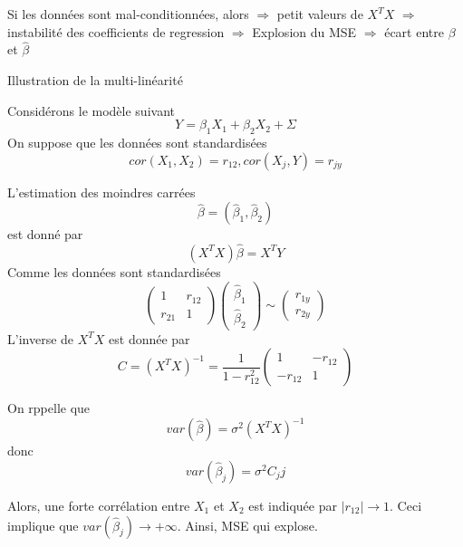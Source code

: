 \documentclass{article}
\begin{document}
Si les donn\'ees sont mal-conditionn\'ees, alors
$\Rightarrow$ petit valeurs de $X^TX$
$\Rightarrow$ instabilit\'e des coefficients de regression
$\Rightarrow$ Explosion du MSE
$\Rightarrow$ \'ecart entre $\beta$ et $\hat{\beta}$


Illustration de la multi-lin\'earit\'e

Consid\'erons le mod\`ele suivant
\begin{equation}
Y=\beta_1X_1+\beta_2X_2+\Sigma
\end{equation}
On suppose que les donn\'ees sont standardis\'ees
\begin{equation}
cor(X_1,X_2)=r_{12}, cor(X_j,Y)=r_{jy}
\end{equation}

L'estimation des moindres carr\'ees 
\begin{equation}
\hat{\beta}=(\hat{\beta}_1,\hat{\beta}_2)
\end{equation}
est donn\'e par
\begin{equation}
(X^TX)\hat{\beta}=X^TY
\end{equation}
Comme les donn\'ees sont standardis\'ees
\begin{equation}
\left(\begin{array}{cc}
1 & r_{12} \\
r_{21} & 1
\end{array}\right)
\left(\begin{array}{cc}
\hat{\beta}_1\\
\hat{\beta}_2
\end{array}\right)\sim
\left(\begin{array}{c}
r_{1y}\\
r_{2y}
\end{array}\right)
\end{equation}
L'inverse de $X^TX$ est donn\'ee par 
\begin{equation}
C=(X^TX)^{-1}=\frac{1}{1-r_{12}^2}\left(\begin{array}{cc}
1 & -r_{12}\\
-r_{12} & 1
\end{array}\right)
\end{equation}

On rppelle que
\begin{equation}
var(\hat{\beta})=\sigma^2(X^TX)^{-1}
\end{equation}
donc
\begin{equation}
var(\hat{\beta}_j)=\sigma^2C_jj
\end{equation}

Alors, une forte corr\'elation entre $X_1$ et $X_2$ est indiqu\'ee par $|r_{12}|\to 1$. Ceci implique que $var(\hat{\beta}_j)\to +\infty$.
Ainsi, MSE qui explose.
\end{document}
